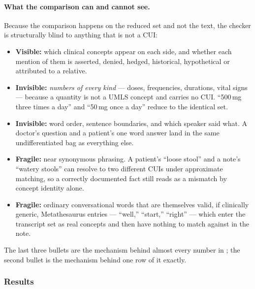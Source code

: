 \paragraph{What the comparison can and cannot see.}
Because the comparison happens on the reduced set and not the text, the checker
is structurally blind to anything that is not a CUI:
\begin{itemize}
    \item \textbf{Visible:} which clinical concepts appear on each side, and
          whether each mention of them is asserted, denied, hedged, historical,
          hypothetical or attributed to a relative.
    \item \textbf{Invisible:} \emph{numbers of every kind} --- doses, frequencies,
          durations, vital signs --- because a quantity is not a UMLS concept and
          carries no CUI. ``500\,mg three times a day'' and ``50\,mg once a day''
          reduce to the identical set.
    \item \textbf{Invisible:} word order, sentence boundaries, and which speaker
          said what. A doctor's question and a patient's one word answer land in
          the same undifferentiated bag as everything else.
    \item \textbf{Fragile:} near synonymous phrasing. A patient's ``loose stool''
          and a note's ``watery stools'' can resolve to two different CUIs under
          approximate matching, so a correctly documented fact still reads as a
          mismatch by concept identity alone.
    \item \textbf{Fragile:} ordinary conversational words that are themselves
          valid, if clinically generic, Metathesaurus entries --- ``well,''
          ``start,'' ``right'' --- which enter the transcript set as real
          concepts and then have nothing to match against in the note.
\end{itemize}
The last three bullets are the mechanism behind almost every number in
; the second bullet is the mechanism behind one row of
it exactly.



\subsubsection{Results}
\label{sec:medspacy_results}

